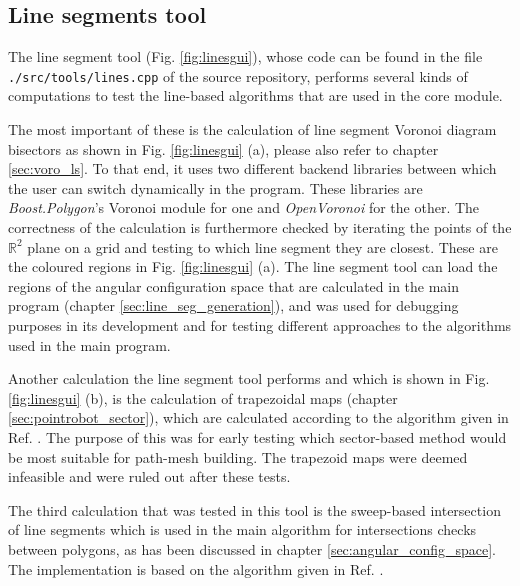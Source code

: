 \subsection{Line segments tool}
\label{sec:tests_linesegs}
The line segment tool (Fig. \ref{fig:linesgui}), whose code can be found in the file 
\lstinline|./src/tools/lines.cpp| of the source repository, 
performs several kinds of computations to test the line-based algorithms that are used in the core module.

The most important of these is the calculation of line segment Voronoi diagram bisectors as shown in 
Fig. \ref{fig:linesgui} (a), please also refer to chapter \ref{sec:voro_ls}.
To that end, it uses two different backend libraries between which the user can switch dynamically in
the program. These libraries are \textit{Boost.Polygon}'s Voronoi module \cite{web_boost_polygon_voronoi} for one
and \textit{OpenVoronoi} \cite{web_openvoronoi} for the other.
The correctness of the calculation is furthermore checked by iterating the points of the $\mathbb{R}^2$ plane
on a grid and testing to which line segment they are closest. These are the coloured regions in Fig. \ref{fig:linesgui} (a).
The line segment tool can load the regions of the angular configuration space that are calculated in the main
program (chapter \ref{sec:line_seg_generation}), and was used for debugging purposes in its development and
for testing different approaches to the algorithms used in the main program.

Another calculation the line segment tool performs and which is shown in Fig. \ref{fig:linesgui} (b), is the 
calculation of trapezoidal maps (chapter \ref{sec:pointrobot_sector}), which are calculated according to the 
algorithm given in Ref. \cite[Ch. 6, pp. 121-146]{Berg2008}.
The purpose of this was for early testing which sector-based method would be most suitable
for path-mesh building. The trapezoid maps were deemed infeasible and were ruled out after
these tests.

The third calculation that was tested in this tool is the sweep-based intersection of line segments which
is used in the main algorithm for intersections checks between polygons, as has been discussed in 
chapter \ref{sec:angular_config_space}.
The implementation is based on the algorithm given in Ref. \cite[pp. 69-80]{FUH_geo2020}.

